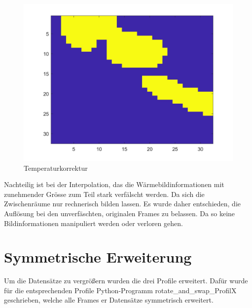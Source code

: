 \begin{figure}[!ht]
\begin{minipage}[c]{0.3\linewidth  }
	\includegraphics[width=1.0\linewidth]{fig/interpol_3}
	\caption[Temperaturkorrektur]{Temperaturkorrektur}
	\label{fig:interpol3}
\end{minipage}
\end{figure}


Nachteilig ist bei der Interpolation, das die Wärmebildinformationen mit zunehmender Grösse zum Teil stark verfälscht werden. Da sich die Zwischenräume nur rechnerisch bilden lassen. Es wurde daher entschieden, die Auflösung bei den unverfäschten, originalen Frames zu belassen. Da so keine Bildinformationen manipuliert werden oder verloren gehen. 



\section{Symmetrische Erweiterung}

Um die Datensätze zu vergrößern wurden die drei Profile erweitert. Dafür wurde für die entsprechenden Profile Python-Programm rotate\_and\_swap\_ProfilX  geschrieben, welche alle Frames er Datensätze symmetrisch erweitert.  

